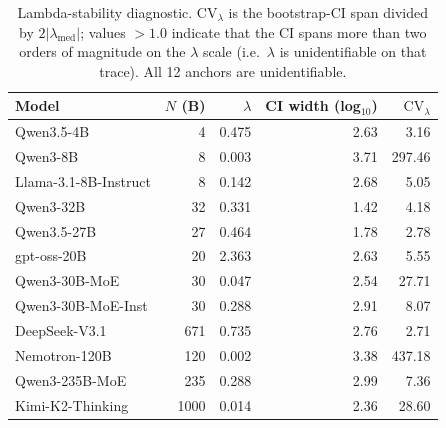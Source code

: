 \begin{table}[t]
\centering
\small
\caption{Lambda-stability diagnostic.  $\mathrm{CV}_\lambda$ is the
bootstrap-CI span divided by $2 |\lambda_\mathrm{med}|$; values
$> 1.0$ indicate that the CI spans more than two orders of magnitude
on the $\lambda$ scale (i.e.\ $\lambda$ is unidentifiable on that
trace).  All 12 anchors are unidentifiable.
\label{tab:iter109-stability}}
\begin{tabular}{lrrrr}
\toprule
Model & $N$ (B) & $\lambda$ & CI width (log$_{10}$) & $\mathrm{CV}_\lambda$ \\
\midrule
Qwen3.5-4B            &    4 &  0.475 &  2.63 &    3.16 \\
Qwen3-8B              &    8 &  0.003 &  3.71 &  297.46 \\
Llama-3.1-8B-Instruct &    8 &  0.142 &  2.68 &    5.05 \\
Qwen3-32B             &   32 &  0.331 &  1.42 &    4.18 \\
Qwen3.5-27B           &   27 &  0.464 &  1.78 &    2.78 \\
gpt-oss-20B           &   20 &  2.363 &  2.63 &    5.55 \\
Qwen3-30B-MoE         &   30 &  0.047 &  2.54 &   27.71 \\
Qwen3-30B-MoE-Inst    &   30 &  0.288 &  2.91 &    8.07 \\
DeepSeek-V3.1         &  671 &  0.735 &  2.76 &    2.71 \\
Nemotron-120B         &  120 &  0.002 &  3.38 &  437.18 \\
Qwen3-235B-MoE        &  235 &  0.288 &  2.99 &    7.36 \\
Kimi-K2-Thinking      & 1000 &  0.014 &  2.36 &   28.60 \\
\bottomrule
\end{tabular}
\end{table}